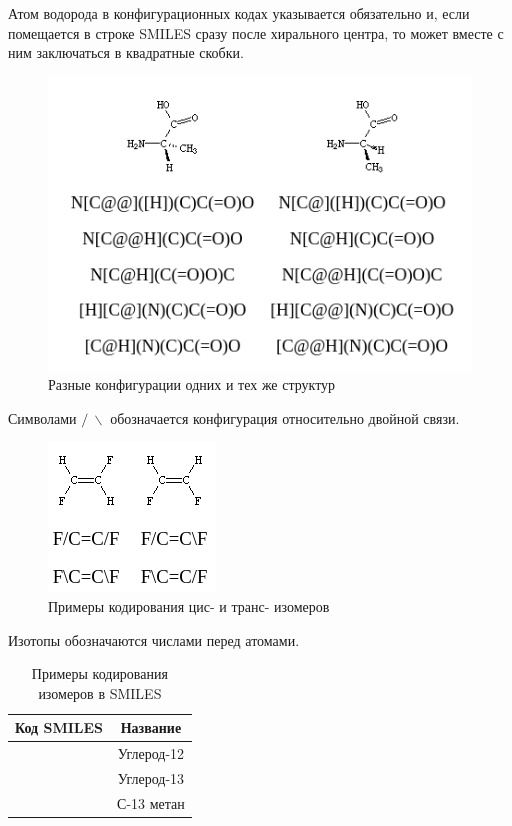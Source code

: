 \documentclass[a4paper,14pt]{extreport}
\begin{document}
Атом водорода в конфигурационных кодах указывается обязательно и, если помещается в строке SMILES сразу после хирального центра, то может вместе с ним заключаться в квадратные скобки.


\begin{figure}[htp]
\centering
\includegraphics[scale=0.80]{images/Screenshot from 2021-12-04 16-57-53.png}
\caption{Разные конфигурации одних и тех же структур}
\label{configs}
\end{figure}

Символами $/\ \backslash$ обозначается конфигурация относительно двойной связи.

\begin{figure}[htp]
\centering
\includegraphics[scale=1.00]{images/Screenshot from 2021-12-04 16-59-41.png}
\caption{Примеры кодирования цис- и транс- изомеров}
\label{isomeric}
\end{figure}


\begin{table}[H]
Изотопы обозначаются числами перед атомами.
\caption{Примеры кодирования изомеров в SMILES}
\begin{center}
\begin{tabular}{|c|c|}
\hline
	Код SMILES &  Название\\
\hline
	[12C] & Углерод-12\\
\hline
	[13C] & Углерод-13\\
\hline
	[13CH4] & С-13 метан\\
\hline
\end{tabular}
\end{center}
\end{table}
\end{document}

